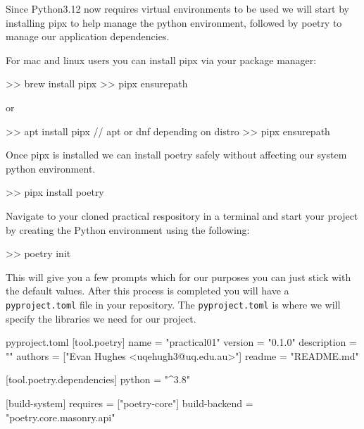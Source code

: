 \documentclass{csse4400}
\begin{document}
Since Python3.12 now requires virtual environments to be used we will start by installing pipx to help manage the python environment, followed by poetry to manage our application dependencies.

For mac and linux users you can install pipx via your package manager:

\begin{code}[language=bash,numbers=none]{}
  >> brew install pipx
  >> pipx ensurepath
\end{code}

or 

\begin{code}[language=bash,numbers=none]{}
  >> apt install pipx // apt or dnf depending on distro
  >> pipx ensurepath 
\end{code}

Once pipx is installed we can install poetry safely without affecting our system python environment.

\begin{code}[language=bash,numbers=none]{}
  >> pipx install poetry
\end{code}

Navigate to your cloned practical respository in a terminal and start your project by creating the Python environment using the following:

\begin{code}[language=bash,numbers=none]{}
  >> poetry init
\end{code}

This will give you a few prompts which for our purposes you can just stick with the default values.
After this process is completed you will have a \texttt{pyproject.toml} file in your repository.
The \texttt{pyproject.toml} is where we will specify the libraries we need for our project.

\begin{code}{pyproject.toml}
  [tool.poetry]
  name = "practical01"
  version = "0.1.0"
  description = ""
  authors = ["Evan Hughes <uqehugh3@uq.edu.au>"]
  readme = "README.md"
  
  [tool.poetry.dependencies]
  python = "^3.8"
  
  
  [build-system]
  requires = ["poetry-core"]
  build-backend = "poetry.core.masonry.api"
\end{code}

\end{document}
